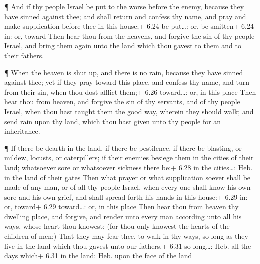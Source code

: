  ¶ And if thy people Israel be put to the worse before the
enemy, because they have sinned against thee; and shall return and
confess thy name, and pray and make supplication before thee in this
house;+ 6.24 be put\ldots: or, be smitten+ 6.24 in: or, toward
 Then hear thou from the heavens, and forgive the sin of
thy people Israel, and bring them again unto the land which thou gavest
to them and to their fathers.

 ¶ When the heaven is shut up, and there is no rain,
because they have sinned against thee; yet if they pray toward this
place, and confess thy name, and turn from their sin, when thou dost
afflict them;+ 6.26 toward\ldots: or, in this place  Then
hear thou from heaven, and forgive the sin of thy servants, and of thy
people Israel, when thou hast taught them the good way, wherein they
should walk; and send rain upon thy land, which thou hast given unto thy
people for an inheritance.

 ¶ If there be dearth in the land, if there be pestilence,
if there be blasting, or mildew, locusts, or caterpillers; if their
enemies besiege them in the cities of their land; whatsoever sore or
whatsoever sickness there be:+ 6.28 in the cities\ldots: Heb. in the
land of their gates  Then what prayer or what supplication
soever shall be made of any man, or of all thy people Israel, when every
one shall know his own sore and his own grief, and shall spread forth
his hands in this house:+ 6.29 in: or, toward+ 6.29 toward\ldots: or, in
this place  Then hear thou from heaven thy dwelling place,
and forgive, and render unto every man according unto all his ways,
whose heart thou knowest; (for thou only knowest the hearts of the
children of men:)  That they may fear thee, to walk in thy
ways, so long as they live in the land which thou gavest unto our
fathers.+ 6.31 so long\ldots: Heb. all the days which+ 6.31 in the land:
Heb. upon the face of the land

